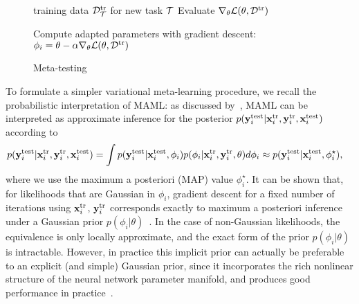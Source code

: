 \documentclass{article}
\begin{document}
\begin{figure*}[ttt!]
\begin{minipage}[t]{0.6\textwidth}
\begin{algorithm}[H]
\begin{algorithmic}[1]
    \EndWhile
\end{algorithmic}
\end{algorithm}
\end{minipage}
\begin{minipage}[t]{0.39\textwidth}
\vspace{1.5cm}
\begin{algorithm}[H]
    \caption{Meta-testing}
    \small
    \label{alg:promamltest}
    \begin{algorithmic}[1]
    \Require training data $\mathcal{D}^\text{tr}_{\mathcal{T}}$ for new task $\mathcal{T}$
    \Require {}
    \State {}
     \State Evaluate $\nabla_\theta \mathcal{L}(\theta, \mathcal{D}^\text{tr})$
     \State \begin{varwidth}[t]{\linewidth} Compute adapted parameters with gradient descent: \\ $\phi_i=\theta-\alpha \nabla_\theta  \mathcal{L}(  \theta, \mathcal{D}^\text{tr})$
     \end{varwidth}
    \end{algorithmic}
\end{algorithm}
\end{minipage}
\vspace{-0.3cm}
\end{figure*} 
To formulate a simpler variational meta-learning procedure, we recall the probabilistic interpretation of MAML: as discussed by~\citet{grant2018recasting}, MAML can be interpreted as approximate inference for the posterior $p(\mathbf{y}^{\text{test}}_i | \mathbf{x}^{\text{tr}}_i, \mathbf{y}^{\text{tr}}_i, \mathbf{x}^{\text{test}}_i)$ according to
\begin{align}
p(\mathbf{y}^{\text{test}}_i | \mathbf{x}^{\text{tr}}_i, \mathbf{y}^{\text{tr}}_i, \mathbf{x}^{\text{test}}_i) &= \int p(\mathbf{y}^{\text{test}}_i | \mathbf{x}^{\text{test}}_i, \phi_i) p(\phi_i | \mathbf{x}^{\text{tr}}_i, \mathbf{y}^{\text{tr}}_i, \theta) d\phi_i \approx p(\mathbf{y}^{\text{test}}_i | \mathbf{x}^{\text{test}}_i, \phi_i^\star),
\end{align}
where we use the maximum a posteriori (MAP) value $\phi_i^\star$. It can be shown that, for likelihoods that are Gaussian in $\phi_i$, gradient descent for a fixed number of iterations using $\mathbf{x}^{\text{tr}}_i$, $\mathbf{y}^{\text{tr}}_i$ corresponds exactly to maximum a posteriori inference under a Gaussian prior $p(\phi_i | \theta)$~\cite{santos}. In the case of non-Gaussian likelihoods, the equivalence is only locally approximate, and the exact form of the prior $p(\phi_i | \theta)$ is intractable. However, in practice this implicit prior can actually be preferable to an explicit (and simple) Gaussian prior, since it incorporates the rich nonlinear structure of the neural network parameter manifold, and produces good performance in practice~\cite{finn2017model,grant2018recasting}.
\end{document}
